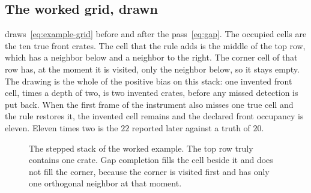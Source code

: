 \subsection{The worked grid, drawn}
\label{sec:grid-drawn}

 draws~\eqref{eq:example-grid} before and after the pass~\eqref{eq:gap}. The occupied cells are the ten true front crates. The cell that the rule adds is the middle of the top row, which has a neighbor below and a neighbor to the right. The corner cell of that row has, at the moment it is visited, only the neighbor below, so it stays empty. The drawing is the whole of the positive bias on this stack: one invented front cell, times a depth of two, is two invented crates, before any missed detection is put back. When the first frame of the instrument also misses one true cell and the rule restores it, the invented cell remains and the declared front occupancy is eleven. Eleven times two is the $22$ reported later against a truth of $20$.

\begin{figure}[t]
\centering
{}
\caption{The stepped stack of the worked example. The top row truly contains one crate. Gap completion fills the cell beside it and does not fill the corner, because the corner is visited first and has only one orthogonal neighbor at that moment.}
\label{fig:grid}
\end{figure}

